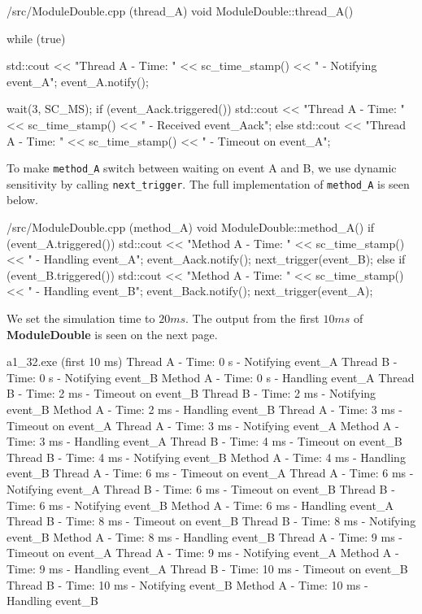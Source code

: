 \documentclass[../main.tex]{subfiles}
\begin{document}
\begin{myminted}{/src/ModuleDouble.cpp (thread\_A)}
void ModuleDouble::thread_A() {
    while (true) {
        std::cout << "Thread A - Time: " << sc_time_stamp() << " - Notifying event_A\n";
        event_A.notify();

        wait(3, SC_MS);
        if (event_Aack.triggered()) {
            std::cout << "Thread A - Time: " << sc_time_stamp() << " - Received event_Aack\n";
        }
        else {
            std::cout << "Thread A - Time: " << sc_time_stamp() << " - Timeout on event_A\n";
        }
    }
}
\end{myminted}

To make \texttt{method\_A} switch between waiting on event A and B, we use dynamic sensitivity by calling \texttt{next\_trigger}. The full implementation of \texttt{method\_A} is seen below.

\begin{myminted}{/src/ModuleDouble.cpp (method\_A)}
void ModuleDouble::method_A() {
    if (event_A.triggered()) {
        std::cout << "Method A - Time: " << sc_time_stamp() << " - Handling event_A\n";
        event_Aack.notify();
        next_trigger(event_B);
    }
    else if (event_B.triggered()) {
        std::cout << "Method A - Time: " << sc_time_stamp() << " - Handling event_B\n";
        event_Back.notify();
        next_trigger(event_A);
    }
}
\end{myminted}

We set the simulation time to $20 \si{ms}$. The output from the first $10 \si{ms}$ of \textbf{ModuleDouble} is seen on the next page.

\newpage

\begin{mintedterminal}{a1\_32.exe (first 10 ms)}
Thread A - Time: 0 s - Notifying event_A
Thread B - Time: 0 s - Notifying event_B
Method A - Time: 0 s - Handling event_A
Thread B - Time: 2 ms - Timeout on event_B
Thread B - Time: 2 ms - Notifying event_B
Method A - Time: 2 ms - Handling event_B
Thread A - Time: 3 ms - Timeout on event_A
Thread A - Time: 3 ms - Notifying event_A
Method A - Time: 3 ms - Handling event_A
Thread B - Time: 4 ms - Timeout on event_B
Thread B - Time: 4 ms - Notifying event_B
Method A - Time: 4 ms - Handling event_B
Thread A - Time: 6 ms - Timeout on event_A
Thread A - Time: 6 ms - Notifying event_A
Thread B - Time: 6 ms - Timeout on event_B
Thread B - Time: 6 ms - Notifying event_B
Method A - Time: 6 ms - Handling event_A
Thread B - Time: 8 ms - Timeout on event_B
Thread B - Time: 8 ms - Notifying event_B
Method A - Time: 8 ms - Handling event_B
Thread A - Time: 9 ms - Timeout on event_A
Thread A - Time: 9 ms - Notifying event_A
Method A - Time: 9 ms - Handling event_A
Thread B - Time: 10 ms - Timeout on event_B
Thread B - Time: 10 ms - Notifying event_B
Method A - Time: 10 ms - Handling event_B
\end{mintedterminal}
\end{document}
